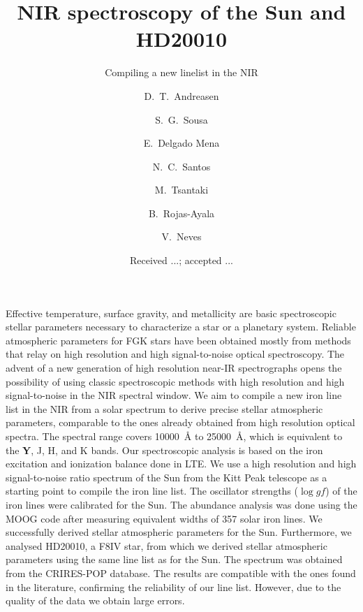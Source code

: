 \documentclass{aa}
\begin{document}
\title{NIR spectroscopy of the Sun and HD20010}
\subtitle{Compiling a new linelist in the NIR}


\author{ D.~T.~Andreasen
    \and S.~G.~Sousa
    \and E.~Delgado Mena
    \and N.~C.~Santos
    \and M.~Tsantaki
    \and B.~Rojas-Ayala
    \and V.~Neves}







\date{Received ...; accepted ...}

\abstract
{Effective temperature, surface gravity, and metallicity are basic
spectroscopic stellar parameters necessary to characterize
a star or a planetary system. Reliable atmospheric parameters for
FGK stars have been obtained mostly from methods that relay on high
resolution and high signal-to-noise optical spectroscopy. The
advent of a new generation of high resolution near-IR spectrographs
opens the possibility of using classic spectroscopic methods with
high resolution and high signal-to-noise in the NIR spectral window.}
{We aim to compile a new iron line list in the NIR from a solar
spectrum to derive precise stellar atmospheric parameters,
comparable to the ones already obtained from high resolution optical
spectra. The spectral range covers \SI{10000}{\angstrom} to
\SI{25000}{\angstrom}, which is equivalent to the \textbf{Y}, J, H, and K bands.}
{Our spectroscopic analysis is based on the iron excitation and
ionization balance done in LTE. We
use a high resolution and high signal-to-noise ratio spectrum of the Sun
from the Kitt Peak telescope as a starting point to compile the iron
line list. The oscillator strengths ($\log\mathit{gf}$) of the iron lines were calibrated for the Sun.
The abundance analysis was done using
the MOOG code after measuring equivalent widths of 357 solar iron lines.}
{We successfully derived stellar atmospheric parameters for the
Sun.
Furthermore, we analysed
HD20010, a F8IV star, from which we derived stellar atmospheric
parameters using the same line list as for the Sun. The spectrum
was obtained from the CRIRES-POP database.
The results are compatible with the ones found in the literature,
confirming the reliability of our line list. However, due to the
quality of the data we obtain large errors.}
{}
\end{document}
